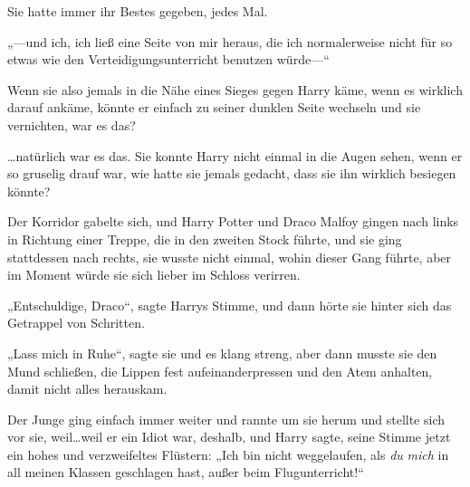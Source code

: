 Sie hatte immer ihr Bestes gegeben, jedes Mal.

„—und ich, ich ließ eine Seite von mir heraus, die ich normalerweise nicht für so etwas wie den Verteidigungsunterricht benutzen würde—“

Wenn sie also jemals in die Nähe eines Sieges gegen Harry käme, wenn es wirklich darauf ankäme, könnte er einfach zu seiner dunklen Seite wechseln und sie vernichten, war es das?

…natürlich war es das. Sie konnte Harry nicht einmal in die Augen sehen, wenn er so gruselig drauf war, wie hatte sie jemals gedacht, dass sie ihn wirklich besiegen könnte?

Der Korridor gabelte sich, und Harry Potter und Draco Malfoy gingen nach links in Richtung einer Treppe, die in den zweiten Stock führte, und sie ging stattdessen nach rechts, sie wusste nicht einmal, wohin dieser Gang führte, aber im Moment würde sie sich lieber im Schloss verirren.

„Entschuldige, Draco“, sagte Harrys Stimme, und dann hörte sie hinter sich das Getrappel von Schritten.

„Lass mich in Ruhe“, sagte sie und es klang streng, aber dann musste sie den Mund schließen, die Lippen fest aufeinanderpressen und den Atem anhalten, damit nicht alles herauskam.

Der Junge ging einfach immer weiter und rannte um sie herum und stellte sich vor sie, weil…weil er ein Idiot war, deshalb, und Harry sagte, seine Stimme jetzt ein hohes und verzweifeltes Flüstern: „Ich bin nicht weggelaufen, als \emph{du} \emph{mich} in all meinen Klassen geschlagen hast, außer beim Flugunterricht!“

